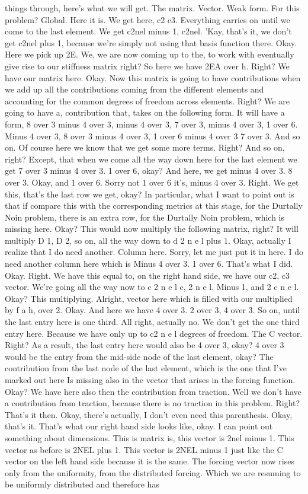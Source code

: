 \documentclass[10pt]{article}
\begin{document}
{things through, here's what we will get. The matrix. Vector. Weak form. For this problem? Global. Here it is. We get here, c2 c3. Everything carries on until we come to the last element. We get c2nel minus 1, c2nel. 'Kay, that's it, we don't get c2nel plus 1, because we're simply not using that basis function there. Okay. Here we pick up 2E. We, we are now coming up to the, to work with eventually give rise to our stiffness matrix right? So here we have 2EA over h. Right? We have our matrix here. Okay. Now this matrix is going to have contributions when we add up all the contributions coming from the different elements and accounting for the common degrees of freedom across elements. Right? We are going to have a, contribution that, takes on the following form. It will have a form, 8 over 3 minus 4 over 3, minus 4 over 3, 7 over 3, minus 4 over 3, 1 over 6. Minus 4 over 3, 8 over 3 minus 4 over 3, 1 over 6 minus 4 over 3 7 over 3. And so on. Of course here we know that we get some more terms. Right? And so on, right? Except, that when we come all the way down here for the last element we get 7 over 3 minus 4 over 3. 1 over 6, okay? And here, we get minus 4 over 3. 8 over 3. Okay, and 1 over 6. Sorry not 1 over 6 it's, minus 4 over 3. Right. We get this, that's the last row we get, okay? In particular, what I want to point out is that if compare this with the corresponding metrics at this stage, for the Durtally Noin problem, there is an extra row, for the Durtally Noin problem, which is missing here. Okay? This would now multiply the following matrix, right? It will multiply D 1, D 2, so on, all the way down to d 2 n e l plus 1. Okay, actually I realize that I do need another. Column here. Sorry, let me just put it in here. I do need another column here which is Minus 4 over 3. 1 over 6. That's what I did. Okay. Right. We have this equal to, on the right hand side, we have our c2, c3 vector. We're going all the way now to c 2 n e l c, 2 n e l. Minus 1, and 2 c n e l. Okay? This multiplying. Alright, vector here which is filled with our multiplied by f a h, over 2. Okay. And here we have 4 over 3. 2 over 3, 4 over 3. So on, until the last entry here is one third. All right, actually no. We don't get the one third entry here. Because we have only up to c2 n e l degrees of freedom. The C vector. Right? As a result, the last entry here would also be 4 over 3, okay? 4 over 3 would be the entry from the mid-side node of the last element, okay? The contribution from the last node of the last element, which is the one that I've marked out here Is missing also in the vector that arises in the forcing function. Okay? We have here also then the contribution from traction. Well we don't have a contribution from traction, because there is no traction in this problem. Right? That's it then. Okay, there's actually, I don't even need this parenthesis. Okay, that's it. That's what our right hand side looks like, okay. I can point out something about dimensions. This is matrix is, this vector is 2nel minus 1. This vector as before is 2NEL plus 1. This vector is 2NEL minus 1 just like the C vector on the left hand side because it is the same. The forcing vector now rises only from the uniformity, from the distributed forcing. Which we are resuming to be uniformly distributed and therefore has }
\end{document}
